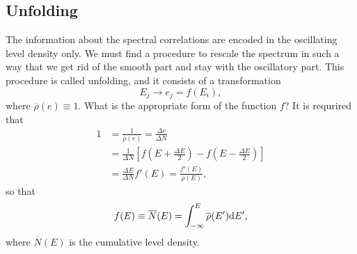 \documentclass[a4paper,11pt,twoside]{article}
\begin{document}
    \subsection{Unfolding}\label{sec:Unfolding}
        The information about the spectral correlations are encoded in the oscillating level density only.
        We must find a procedure to rescale the spectrum in such a way that we get rid of the smooth part and stay with the oscillatory part.
        This procedure is called unfolding, and it consists of a transformation
        \begin{equation}
            E_{j}\longrightarrow e_{j}=f(E_{i}),
        \end{equation}
        where  $\overline{\rho}(e)\equiv1$.
        What is the appropriate form of the function $f$?
        It is requrired that
        \begin{align}
            1&=\frac{1}{\overline{\rho}(e)}=\frac{\Delta e}{\Delta N}\nonumber\\
                &=\frac{1}{\Delta N}\left[f\left(E+\frac{\Delta E}{2}\right)-f\left(E-\frac{\Delta E}{2}\right)\right]\nonumber\\
                &=\frac{\Delta E}{\Delta N}f'(E)=\frac{f'(E)}{\overline{\rho}(E)},
        \end{align}
        so that
        \begin{equation}
            \label{eq:SmoothN}
            f(E)\equiv\overline{N}(E)=\int_{-\infty}^{E}\overline{\rho}(E')\mathrm{d} E',
        \end{equation}
        where $\overline{N}(E)$ is the cumulative level density.
        
\end{document}
